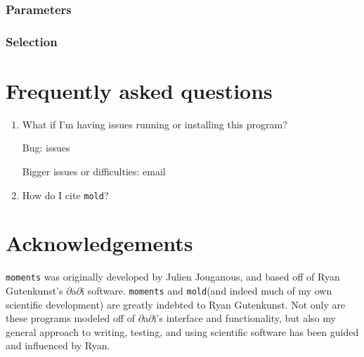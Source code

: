 \documentclass[10pt]{article}
\makeatletter
\newcommand{\dadi}{$\partial$a$\partial$i\xspace}
\newcommand{\mold}{\texttt{mold}\xspace}
\newcommand{\py}[1]{\lstinline[breaklines=true,language=Python, showstringspaces=False]@#1@}
\makeatother
\begin{document}
\subsubsection{Parameters}

\subsubsection{Selection}


\section{Frequently asked questions}

\begin{enumerate}

\item What if I'm having issues running or installing this program?

Bug: issues

Bigger issues or difficulties: email

\item How do I cite \mold?

\end{enumerate}



\section{Acknowledgements}
\py{moments} was originally developed by Julien Jouganous, and based off of Ryan Gutenkunst's \dadi software.
\py{moments} and \mold (and indeed much of my own scientific development) are greatly indebted to Ryan Gutenkunst.
Not only are these programs modeled off of \dadi's interface and functionality, but also my general approach to writing, testing, and using scientific software has been guided and influenced by Ryan.




\end{document}
